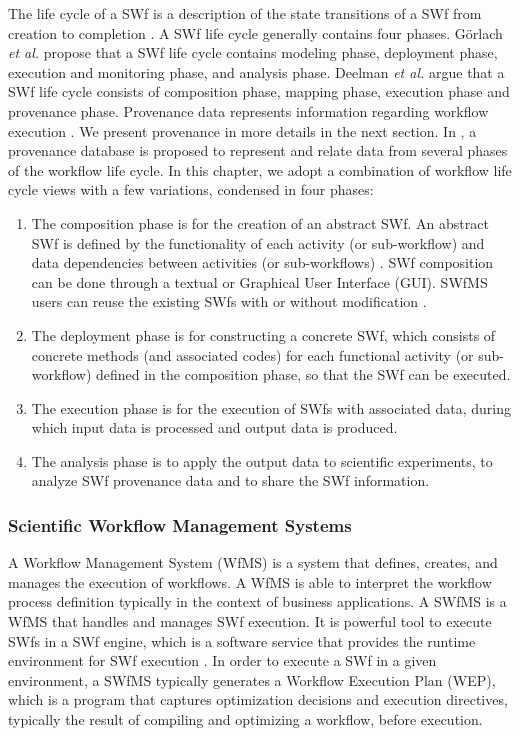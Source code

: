 The life cycle of a SWf is a description of the state
transitions of a SWf from creation to completion
\cite{Deelman2009,Gorlach2011}. A SWf life
cycle generally contains four phases. G\"{o}rlach \textit{et al.} \cite{Gorlach2011}
propose that a SWf life cycle contains modeling phase,
deployment phase, execution and monitoring phase, and analysis phase.
Deelman \textit{et al.} \cite{Deelman2009} argue that a SWf life cycle consists of composition phase, mapping phase,
execution phase and provenance phase. 
Provenance data represents information regarding workflow execution \cite{Freire2008}.
We present provenance in more details in the next section. 
In \cite{Mattoso2010}, a provenance database is proposed to represent and relate data from several phases of the workflow life cycle.
In this chapter, we adopt a combination of workflow life cycle views \cite{Deelman2009,Gorlach2011,Mattoso2010} with a few variations, condensed in four phases:
\begin{enumerate}
\item The composition phase \cite{Deelman2009,Mattoso2010} is for the creation of an abstract SWf.
An abstract SWf is defined by the functionality of each activity (or sub-workflow) and data dependencies
between activities (or sub-workflows) \cite{Gottdank2014,Tersty2014}. 
SWf composition can be done through a textual or Graphical User Interface (GUI). 
SWfMS users can reuse the existing SWfs with or without modification \cite{Holl2012}.
\item The deployment phase \cite{Gorlach2011} is for constructing a concrete SWf, 
which consists of concrete methods (and associated codes) for each functional activity (or sub-workflow) defined in the composition phase, so that the SWf can be executed. 
\item The execution phase \cite{Deelman2009,Mattoso2010} is for the execution of SWfs with associated
data, during which input data is processed and output data is produced.
\item The analysis phase \cite{Gorlach2011,Mattoso2010} is to apply the output data to scientific experiments, to analyze SWf provenance data and to share the SWf information.
\end{enumerate}

\subsubsection{Scientific Workflow Management Systems}

A Workflow Management System (WfMS) is a system that defines, creates,
and manages the execution of workflows. A WfMS is able to interpret
the workflow process definition typically in the context of business applications.
A SWfMS is a WfMS that handles and manages SWf execution. 
It is powerful tool to execute SWfs in a SWf
engine, which is a software service that provides
the runtime environment for SWf execution \cite{Balasko2014}.
In order to execute a SWf in a given environment,
a SWfMS typically generates a Workflow Execution Plan (WEP), which is a program that captures optimization decisions
and execution directives, typically the result of compiling and optimizing a workflow, before execution. 

